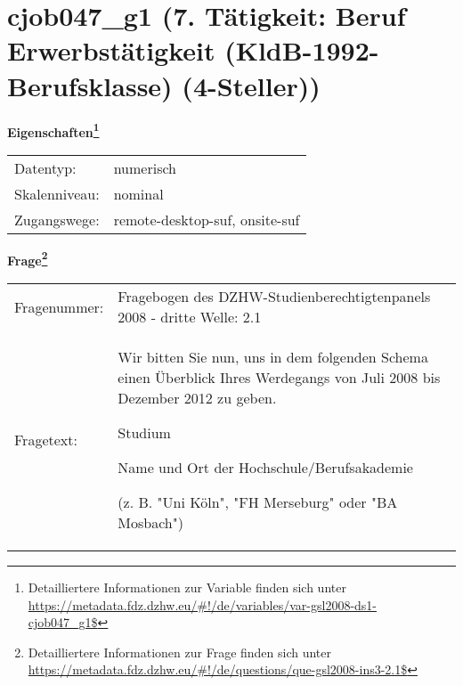 
    \setcounter{footnote}{0}

    \vspace*{-1.8cm}
	\section{cjob047\_g1 (7. Tätigkeit: Beruf Erwerbstätigkeit (KldB-1992-Berufsklasse) (4-Steller))}
	\label{section:cjob047_g1}



    \vspace*{0.5cm}
    \noindent\textbf{Eigenschaften\footnote{Detailliertere Informationen zur Variable finden sich unter
		\url{https://metadata.fdz.dzhw.eu/\#!/de/variables/var-gsl2008-ds1-cjob047_g1$}}}\\
	\begin{tabularx}{\hsize}{@{}lX}
	Datentyp: & numerisch \\
	Skalenniveau: & nominal \\
	Zugangswege: &
	  remote-desktop-suf, 
	  onsite-suf
 \\
    \end{tabularx}



				\vspace*{0.5cm}
                \noindent\textbf{Frage\footnote{Detailliertere Informationen zur Frage finden sich unter
		              \url{https://metadata.fdz.dzhw.eu/\#!/de/questions/que-gsl2008-ins3-2.1$}}}\\
				\begin{tabularx}{\hsize}{@{}lX}
					Fragenummer: &
					  Fragebogen des DZHW-Studienberechtigtenpanels 2008 - dritte Welle:
					  2.1
 \\
					Fragetext: & Wir bitten Sie nun, uns in dem folgenden Schema einen Überblick Ihres Werdegangs von Juli 2008 bis Dezember 2012 zu geben.\par  Studium\par  Name und Ort der Hochschule/Berufsakademie\par  (z. B. "Uni Köln", "FH Merseburg" oder "BA Mosbach") \\
				\end{tabularx}





